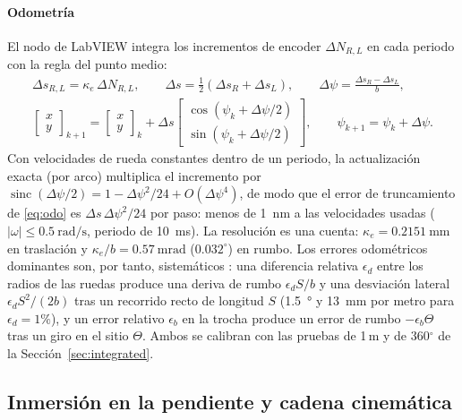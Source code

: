 \paragraph{Odometría}
El nodo de LabVIEW integra los incrementos de encoder $\Delta N_{R,L}$ en cada periodo con la regla del punto medio:
\begin{gather}
  \Delta s_{R,L}=\kappa_e\,\Delta N_{R,L},\qquad \Delta s=\tfrac12(\Delta s_R+\Delta s_L),\qquad \Delta\psi=\frac{\Delta s_R-\Delta s_L}{b},\\
  \begin{bmatrix}x\\y\end{bmatrix}_{k+1}=\begin{bmatrix}x\\y\end{bmatrix}_{k}+\Delta s\begin{bmatrix}\cos(\psi_k+\Delta\psi/2)\\ \sin(\psi_k+\Delta\psi/2)\end{bmatrix},\qquad \psi_{k+1}=\psi_k+\Delta\psi .
  \label{eq:odo}
\end{gather}
Con velocidades de rueda constantes dentro de un periodo, la actualización exacta (por arco) multiplica el incremento por $\operatorname{sinc}(\Delta\psi/2)=1-\Delta\psi^2/24+O(\Delta\psi^4)$, de modo que el error de truncamiento de \eqref{eq:odo} es $\Delta s\,\Delta\psi^2/24$ por paso: menos de \SI{1}{\nano\metre} a las velocidades usadas ($|\omega|\le\SI{0.5}{\radian\per\second}$, periodo de \SI{10}{\milli\second}). La resolución es una cuenta: $\kappa_e=\SI{0.2151}{\milli\metre}$ en traslación y $\kappa_e/b=\SI{0.57}{\milli\radian}$ ($0.032^\circ$) en rumbo. Los errores odométricos dominantes son, por tanto, sistemáticos \cite{borenstein1996}: una diferencia relativa $\epsilon_d$ entre los radios de las ruedas produce una deriva de rumbo $\epsilon_d S/b$ y una desviación lateral $\epsilon_d S^2/(2b)$ tras un recorrido recto de longitud $S$ (\SI{1.5}{\degree} y \SI{13}{\milli\metre} por metro para $\epsilon_d=1\%$), y un error relativo $\epsilon_b$ en la trocha produce un error de rumbo $-\epsilon_b\Theta$ tras un giro en el sitio $\Theta$. Ambos se calibran con las pruebas de 1\,m y de 360$^\circ$ de la Sección~\ref{sec:integrated}.

\subsection{Inmersión en la pendiente y cadena cinemática}
\label{sec:chain}

